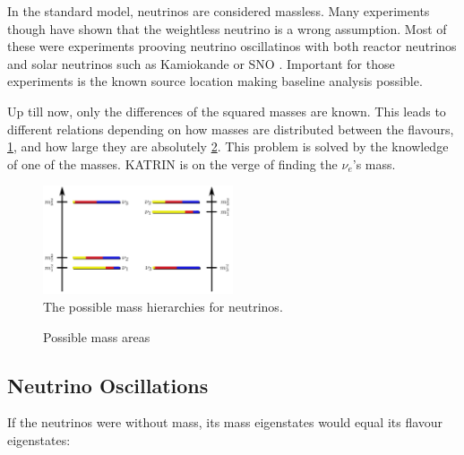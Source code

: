     
    In the standard model, neutrinos are considered massless. 
    Many experiments though have shown that the weightless neutrino is a wrong assumption. Most of these were experiments prooving neutrino oscillatinos with both reactor neutrinos and solar neutrinos such as Kamiokande\cite{PhysRevLett.110.181802} or SNO \cite{SNOOscillations} .
    Important for those experiments is the known source location making baseline analysis possible.
    
    Up till now, only the differences of the squared masses are known. This leads to different relations depending on how masses are distributed between the flavours, \ref{fig:massSchemes}, and how large they are absolutely \ref{fig:massHierarchy}. This problem is solved by the knowledge of one of the masses. KATRIN is on the verge of finding the $\nu_e$'s mass.\cite{becker2008a}
    
    \begin{figure}
    \centering
    \includegraphics[width=0.5\textwidth]{graphics/standardModel/massHierarchy.jpg}
    	 \caption[Neutrino mass hierarchy]{The possible mass hierarchies for neutrinos.}
    	\label{fig:massSchemes}
    \end{figure}
    \begin{figure}
	\caption[Neutrino mass areas]{Possible mass areas}
    	\label{fig:massHierarchy}
    \end{figure}

    
    \subsection{Neutrino Oscillations}
    \label{ch:Introduction:sec:Massive neutrino:subsec:neutrino Oscillations}
      If the neutrinos were without mass, its mass eigenstates would equal its flavour eigenstates:
      
